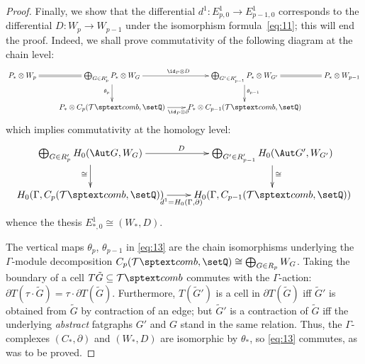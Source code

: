 \begin{proof}
  Finally, we show that the differential $d^1: E^1_{p,0} \to E^1_{p-1,
    0}$ corresponds to the differential $D: W_p \to W_{p-1}$ under the
  isomorphism formula~\ref{eq:11}; this will end the proof.  Indeed, we
  shall prove commutativity of the following diagram at the chain
  level:
  \begin{equation}
    \label{eq:13}
    \xymatrix{%
      P_* \otimes W_p
      &
      \bigoplus_{G \in R'_p} P_* \otimes W_G
      &
      \bigoplus_{G' \in R'_{p-1}} P_* \otimes W_{G'} 
      & 
      P_* \otimes W_{p-1} 
      \\
      & 
      P_* \otimes C_p(\Tcomb, \setQ)
      &
      P_* \otimes C_{p-1}(\Tcomb, \setQ) 
      &
      \ar^{\id_P \otimes D} "1,2";"1,3"
      \ar_{\id_P \otimes \partial} "2,2";"2,3"
      \ar_{\theta_p} "1,2";"2,2"
      \ar^{\theta_{p-1}} "1,3";"2,3"
      \ar@{=} "1,1";"1,2"
      \ar@{=} "1,3";"1,4"
    }
  \end{equation}
  which implies commutativity at the homology level:
  \begin{equation*}
    \xymatrix{%
      \bigoplus_{G \in R'_p} H_0(\Aut G, W_G)
      &
      \bigoplus_{G' \in R'_{p-1}} H_0(\Aut G', W_{G'})
      \\
      H_0(\Gamma, C_p(\Tcomb, \setQ))
      &
      H_0(\Gamma, C_{p-1}(\Tcomb, \setQ))
      \ar^{D} "1,1";"1,2"
      \ar_{d^1 = H_0(\Gamma, \partial)} "2,1";"2,2"
      \ar_{\cong} "1,1";"2,1"
      \ar^{\cong} "1,2";"2,2"
    }
  \end{equation*}
  whence the thesis $E^1_{*,0} \cong (W_*, D)$.

  The vertical maps $\theta_p$, $\theta_{p-1}$ in \eqref{eq:13} are the chain
  isomorphisms underlying the $\Gamma$-module decomposition $C_p(\Tcomb, \setQ)
  \cong \bigoplus_{G \in R_p} W_G$.  Taking the boundary of a cell $T{\tilde G} \subseteq
  \Tcomb$ commutes with the $\Gamma$-action: $\partial T(\tau \cdot {\tilde G}) = \tau \cdot \partial
  T({\tilde G})$.  Furthermore, $T({\tilde G}')$ is a cell in
  $\partial T({\tilde G})$ iff ${\tilde G}'$ is obtained from ${\tilde G}$ by
  contraction of an edge; but ${\tilde G}'$ is a contraction of
  ${\tilde G}$ iff the underlying \emph{abstract} fatgraphs $G'$
  and $G$ stand in the same relation.  Thus, the $\Gamma$-complexes $(C_*,
  \partial)$ and $(W_*, D)$ are isomorphic by $\theta_*$, so \eqref{eq:13}
  commutes, as was to be proved.
\end{proof}



